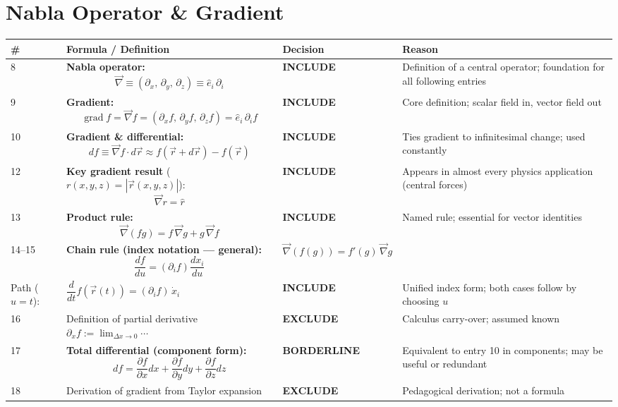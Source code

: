 \documentclass[11pt,a4paper]{article}
\newcommand{\inc}{\textbf{\textcolor{incgreen}{INCLUDE}}}
\newcommand{\exc}{\textbf{\textcolor{exred}{EXCLUDE}}}
\newcommand{\bord}{\textbf{\textcolor{borderorange}{BORDERLINE}}}
\begin{document}
\section{Nabla Operator \& Gradient}

\begin{longtable}{p{0.5cm} p{7.5cm} p{2.2cm} p{3.5cm}}
\toprule
\# & Formula / Definition & Decision & Reason \\
\midrule
\endhead

8 & \textbf{Nabla operator:}
\[
  \vec{\nabla} \equiv (\partial_x,\,\partial_y,\,\partial_z) \equiv \hat{e}_i\,\partial_i
\]
& \inc & Definition of a central operator; foundation for all following entries \\[14pt]

9 & \textbf{Gradient:}
\[
  \operatorname{grad}f = \vec{\nabla}f = (\partial_x f,\,\partial_y f,\,\partial_z f) = \hat{e}_i\,\partial_i f
\]
& \inc & Core definition; scalar field in, vector field out \\[14pt]

10 & \textbf{Gradient \& differential:}
\[
  df \equiv \vec{\nabla}f\cdot d\vec{r} \approx f(\vec{r}+d\vec{r})-f(\vec{r})
\]
& \inc & Ties gradient to infinitesimal change; used constantly \\[14pt]

12 & \textbf{Key gradient result} ($r(x,y,z) = |\vec{r}(x,y,z)|$):
\[
  \vec{\nabla}r = \hat{r}
\]
& \inc & Appears in almost every physics application (central forces) \\[10pt]

13 & \textbf{Product rule:}
\[
  \vec{\nabla}(fg) = f\,\vec{\nabla}g + g\,\vec{\nabla}f
\]
& \inc & Named rule; essential for vector identities \\[14pt]

14--15 & \textbf{Chain rule (index notation --- general):}
\[
  \frac{df}{du} = (\partial_i f)\frac{dx_i}{du}
\]
\begin{tabular}{@{}l@{\;}l@{}}
  Scalar ($u=x_j$): & $\vec{\nabla}(f(g)) = f'(g)\,\vec{\nabla}g$ \\[6pt]
  Path ($u=t$):     & $\dfrac{d}{dt}f(\vec{r}(t)) = (\partial_i f)\,\dot{x}_i$
\end{tabular}
& \inc & Unified index form; both cases follow by choosing $u$ \\[28pt]

16 & Definition of partial derivative $\partial_x f := \lim_{\Delta x\to 0}\cdots$ & \exc & Calculus carry-over; assumed known \\[6pt]

17 & \textbf{Total differential (component form):}
\[
  df = \frac{\partial f}{\partial x}dx + \frac{\partial f}{\partial y}dy + \frac{\partial f}{\partial z}dz
\]
& \bord & Equivalent to entry 10 in components; may be useful or redundant \\[14pt]

18 & Derivation of gradient from Taylor expansion & \exc & Pedagogical derivation; not a formula \\[6pt]

\bottomrule
\end{longtable}
\end{document}
